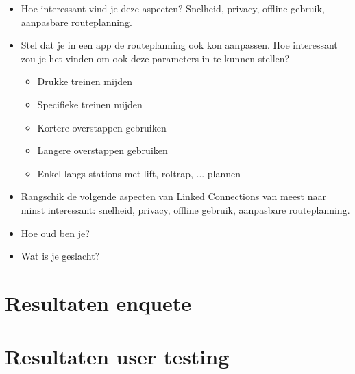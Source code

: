 \begin{appendices}
\begin{itemize}
	\item Hoe interessant vind je deze aspecten? Snelheid, privacy, offline gebruik, aanpasbare routeplanning.
	\item Stel dat je in een app de routeplanning ook kon aanpassen. Hoe interessant zou je het vinden om ook deze parameters in te kunnen stellen?
	\begin{itemize}
		\item 	Drukke treinen mijden
		\item 	Specifieke treinen mijden
		\item 	Kortere overstappen gebruiken	
		\item 	Langere overstappen gebruiken
		\item 	Enkel langs stations met lift, roltrap, ... plannen
	\end{itemize}
	\item Rangschik de volgende aspecten van Linked Connections van meest naar minst interessant: snelheid, privacy, offline gebruik, aanpasbare routeplanning.
	\item Hoe oud ben je?
	\item Wat is je geslacht?
\end{itemize}

\chapter{Resultaten enquete}
\label{appendix:report}


\chapter{Resultaten user testing}
\label{appendix:usertesting}
\end{appendices}